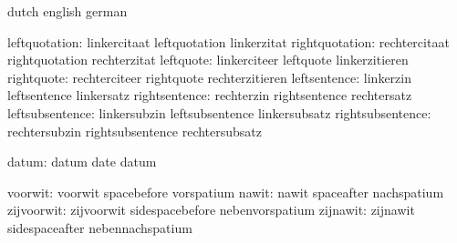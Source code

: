 
\startconstants        dutch                english              german

       leftquotation:  linkercitaat         leftquotation        linkerzitat
      rightquotation:  rechtercitaat        rightquotation       rechterzitat
           leftquote:  linkerciteer         leftquote            linkerzitieren
          rightquote:  rechterciteer        rightquote           rechterzitieren
        leftsentence:  linkerzin            leftsentence         linkersatz
       rightsentence:  rechterzin           rightsentence        rechtersatz
     leftsubsentence:  linkersubzin         leftsubsentence      linkersubsatz
    rightsubsentence:  rechtersubzin        rightsubsentence     rechtersubsatz

               datum:  datum                date                 datum

             voorwit:  voorwit              spacebefore          vorspatium
               nawit:  nawit                spaceafter           nachspatium
          zijvoorwit:  zijvoorwit           sidespacebefore      nebenvorspatium
            zijnawit:  zijnawit             sidespaceafter       nebennachspatium

